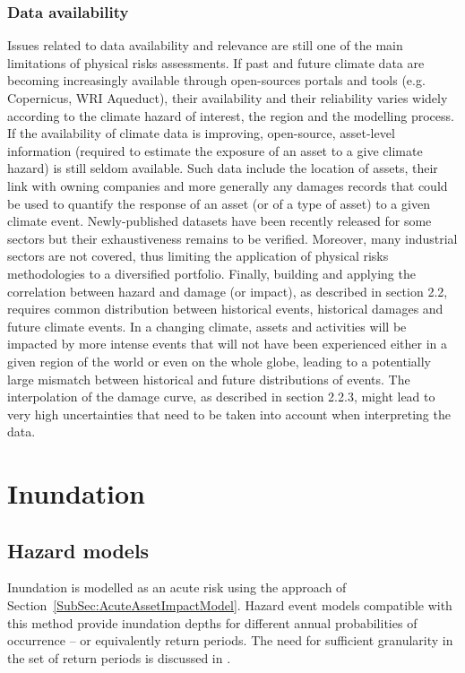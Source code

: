 \documentclass[a4paper,11pt]{extarticle} %
\begin{document}
\subsubsection{Data availability}
Issues related to data availability and relevance are still one of the main limitations of physical risks assessments. If past and future climate data are becoming increasingly available through open-sources portals and tools (e.g. Copernicus, WRI Aqueduct), their availability and their reliability varies widely according to the climate hazard of interest, the region and the modelling process. If the availability of climate data is improving, open-source, asset-level information (required to estimate the exposure of an asset to a give climate hazard) is still seldom available. Such data include the location of assets, their link with owning companies and more generally any damages records that could be used to quantify the response of an asset (or of a type of asset) to a given climate event. Newly-published datasets have been recently released for some sectors but their exhaustiveness remains to be verified. Moreover, many industrial sectors are not covered, thus limiting the application of physical risks methodologies to a diversified portfolio.
Finally, building and applying the correlation between hazard and damage (or impact), as described in section 2.2, requires common distribution between historical events, historical damages and future climate events. In a changing climate, assets and activities will be impacted by more intense events that will not have been experienced either in a given region of the world or even on the
whole globe, leading to a potentially large mismatch between historical and future distributions of events. The interpolation of the damage curve, as described in section 2.2.3, might lead to very high uncertainties that need to be taken into account when interpreting the data.






\section{Inundation}
\subsection{Hazard models}
Inundation is modelled as an acute risk using the approach of Section~\ref{SubSec:AcuteAssetImpactModel}. Hazard event models compatible with this method provide inundation depths for different annual probabilities of occurrence -- or equivalently return periods. The need for sufficient granularity in the set of return periods is discussed in \cite{WardEtAl:2011}. 
\end{document}
